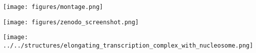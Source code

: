 \documentclass[aspectratio=169]{beamer}
\begin{document}
\begin{frame}[plain]
    \centerline{\texttt{[image: figures/montage.png]}}
\end{frame}

\begin{frame}[t,plain]
    \centerline{\texttt{[image: figures/zenodo\_screenshot.png]}}
\end{frame}

\begin{frame}[t,plain]
    \centerline{\texttt{[image: ../../structures/elongating\_transcription\_complex\_with\_nucleosome.png]}}
\end{frame}



\end{document}

